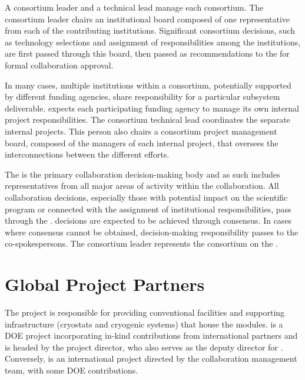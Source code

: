 A consortium leader and a technical lead manage each consortium.  The
consortium leader chairs an institutional board composed of one
representative from each of the contributing institutions.
Significant consortium decisions, such as technology selections and
assignment of responsibilities among the institutions, are first
passed through this board, then passed as recommendations to the
  for formal collaboration approval.


In many cases, multiple institutions within a consortium, potentially
supported by different funding agencies, share responsibility for a
particular subsystem deliverable.   expects each
participating funding agency to manage its own internal project
responsibilities.  The consortium technical lead coordinates the
separate internal projects. This person also chairs a consortium
project management board, composed of the managers of each internal
project, that oversees the interconnections between the different
efforts.



The   is the primary collaboration
decision-making body and as such includes representatives from all
major areas of activity within the collaboration.  All collaboration
decisions, especially those with potential impact on the 
scientific program or connected with the assignment of institutional
responsibilities, pass through the .   decisions
are expected to be achieved through consensus.  In cases where
consensus cannot be obtained, decision-making responsibility passes to
the co-spokespersons.  The consortium leader represents the consortium
on the .

\section{Global Project Partners}
\label{sec:partners}


The  project is responsible for providing conventional
facilities and supporting infrastructure (cryostats and cryogenic
systems) that house the   modules. 
is a  DOE project incorporating in-kind contributions from
international partners and is headed by the  project
director, who also serves as the  deputy director for
.  Conversely,  is an international project
directed by the  collaboration management team, with some
 DOE contributions.

